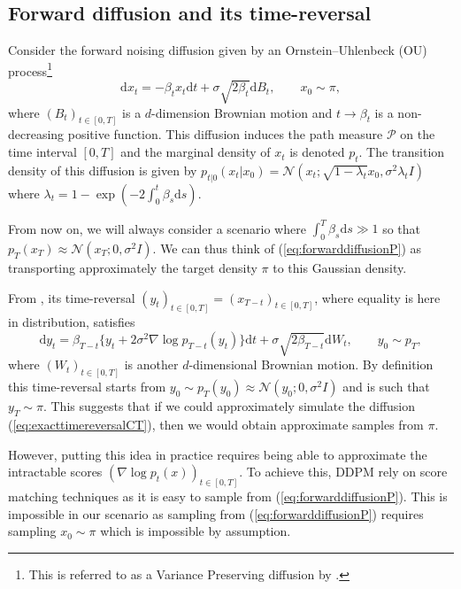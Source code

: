 \documentclass{article} %
\begin{document}
\subsection{Forward diffusion and its time-reversal}
Consider the forward noising diffusion given by an Ornstein--Uhlenbeck (OU) process\footnote{This is referred to as a Variance Preserving diffusion by \cite{song2020score}.}
\begin{equation}\label{eq:forwarddiffusionP}
    \mathrm{d}x_t=-\beta_t x_t \mathrm{d}t+\sigma \sqrt{2\beta_t}\mathrm{d}B_t,\qquad x_0 \sim \pi,
\end{equation}
where $(B_t)_{t\in[0,T]}$ is a $d$-dimension Brownian motion and $t \rightarrow \beta_t$ is a non-decreasing positive function. This diffusion induces the path measure $\mathcal{P}$ on the time interval $[0,T]$ and the marginal density of $x_t$ is denoted $p_t$. The transition density of this diffusion is given by $p_{t|0}(x_t|x_0)=\mathcal{N}(x_t;\sqrt{1-\lambda_t}x_0,\sigma^2 \lambda_t I)$ where $\lambda_t=1-\exp(-2\int^t_0\beta_s \mathrm{d}s)$.

From now on, we will always consider a scenario where  $\int_0^T \beta_s \mathrm{d}s \gg 1$ so that $p_T(x_T)\approx \mathcal{N}(x_T;0,\sigma^2 I)$. We can thus think of (\ref{eq:forwarddiffusionP}) as transporting approximately the target density $\pi$ to this Gaussian density.

From \citep{haussmann1986time}, its time-reversal $(y_t)_{t\in[0,T]}=(x_{T-t})_{t\in[0,T]}$, where equality is here in distribution, satisfies
\begin{equation}\label{eq:exacttimereversalCT}
    \mathrm{d}y_t=\beta_{T-t}\{y_t+2\sigma^2 \nabla \log p_{T-t}(y_t)\} \mathrm{d}t+\sigma \sqrt{2\beta_{T-t}}\mathrm{d}W_t,\qquad y_0 \sim p_{T},
\end{equation}
where $(W_t)_{t\in[0,T]}$ is another $d$-dimensional Brownian motion. By definition this time-reversal starts from $y_0 \sim p_T(y_0)\approx \mathcal{N}(y_0;0,\sigma^2 I)$ and is such that $y_T \sim \pi$. This suggests that if we could approximately simulate the diffusion (\ref{eq:exacttimereversalCT}), then we would obtain approximate samples from $\pi$. 

However, putting this idea in practice requires being able to approximate the intractable scores $(\nabla \log p_t(x))_{t \in [0,T]}$. To achieve this, DDPM rely on score matching techniques \citep{Hyvarinen:2005a,vincent2011connection} as it is easy to sample from (\ref{eq:forwarddiffusionP}). This is impossible in our scenario as sampling from (\ref{eq:forwarddiffusionP}) requires sampling $x_0 \sim \pi$ which is impossible by assumption.
\end{document}
